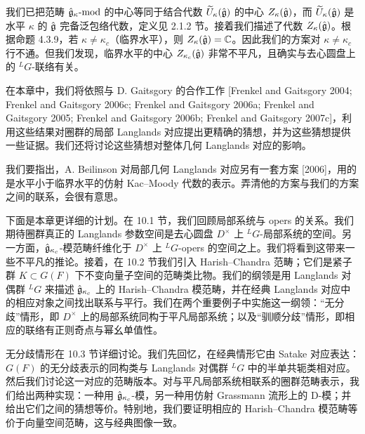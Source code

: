 我们已把范畴 $\hat{\mathfrak{g}}_\kappa\text{-}\mathrm{mod}$ 的中心等同于结合代数 $\widetilde{U}_\kappa(\hat{\mathfrak{g}})$ 的中心 $Z_\kappa(\hat{\mathfrak{g}})$，而 $\widetilde{U}_\kappa(\hat{\mathfrak{g}})$ 是水平 $\kappa$ 的 $\hat{\mathfrak{g}}$ 完备泛包络代数，定义见 2.1.2 节。接着我们描述了代数 $Z_\kappa(\hat{\mathfrak{g}})$。根据命题 4.3.9，若 $\kappa\neq\kappa_c$（临界水平），则 $Z_\kappa(\hat{\mathfrak{g}})=\mathbb{C}$。因此我们的方案对 $\kappa\neq\kappa_c$ 行不通。但我们发现，临界水平的中心 $Z_{\kappa_c}(\hat{\mathfrak{g}})$ 非常不平凡，且确实与去心圆盘上的 ${}^L G$-联络有关。

在本章中，我们将依照与 D. Gaitsgory 的合作工作 [Frenkel and Gaitsgory 2004; Frenkel and Gaitsgory 2006c; Frenkel and Gaitsgory 2006a; Frenkel and Gaitsgory 2005; Frenkel and Gaitsgory 2006b; Frenkel and Gaitsgory 2007c]，利用这些结果对圈群的局部 Langlands 对应提出更精确的猜想，并为这些猜想提供一些证据。我们还将讨论这些猜想对整体几何 Langlands 对应的影响。

我们要指出，A. Beilinson 对局部几何 Langlands 对应另有一套方案 [2006]，用的是水平小于临界水平的仿射 Kac--Moody 代数的表示。弄清他的方案与我们的方案之间的联系，会很有意思。

下面是本章更详细的计划。在 10.1 节，我们回顾局部系统与 opers 的关系。我们期待圈群真正的 Langlands 参数空间是去心圆盘 $D^\times$ 上 ${}^L G$-局部系统的空间。另一方面，$\hat{\mathfrak{g}}_{\kappa_c}$-模范畴纤维化于 $D^\times$ 上 ${}^L G$-opers 的空间之上。我们将看到这带来一些不平凡的推论。接着，在 10.2 节我们引入 Harish--Chandra 范畴；它们是紧子群 $K\subset G(F)$ 下不变向量子空间的范畴类比物。我们的纲领是用 Langlands 对偶群 ${}^L G$ 来描述 $\hat{\mathfrak{g}}_{\kappa_c}$ 上的 Harish--Chandra 模范畴，并在经典 Langlands 对应中的相应对象之间找出联系与平行。我们在两个重要例子中实施这一纲领：“无分歧”情形，即 $D^\times$ 上的局部系统同构于平凡局部系统；以及“驯顺分歧”情形，即相应的联络有正则奇点与幂幺单值性。

无分歧情形在 10.3 节详细讨论。我们先回忆，在经典情形它由 Satake 对应表达：$G(F)$ 的无分歧表示的同构类与 Langlands 对偶群 ${}^L G$ 中的半单共轭类相对应。然后我们讨论这一对应的范畴版本。对与平凡局部系统相联系的圈群范畴表示，我们给出两种实现：一种用 $\hat{\mathfrak{g}}_{\kappa_c}$-模，另一种用仿射 Grassmann 流形上的 D-模；并给出它们之间的猜想等价。特别地，我们要证明相应的 Harish--Chandra 模范畴等价于向量空间范畴，这与经典图像一致。

